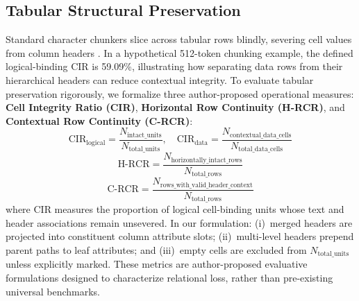 \documentclass[conference,a4paper]{IEEEtran}
\begin{document}
\subsection{Tabular Structural Preservation}
Standard character chunkers slice across tabular rows blindly, severing cell values from column headers \cite{chen2024tablerag}. In a hypothetical 512-token chunking example, the defined logical-binding CIR is 59.09\%, illustrating how separating data rows from their hierarchical headers can reduce contextual integrity. To evaluate tabular preservation rigorously, we formalize three author-proposed operational measures: \textbf{Cell Integrity Ratio (CIR)}, \textbf{Horizontal Row Continuity (H-RCR)}, and \textbf{Contextual Row Continuity (C-RCR)}:
\begin{equation}
\text{CIR}_{\text{logical}} = \frac{N_{\text{intact\_units}}}{N_{\text{total\_units}}}, \quad \text{CIR}_{\text{data}} = \frac{N_{\text{contextual\_data\_cells}}}{N_{\text{total\_data\_cells}}}
\label{eq:cir}
\end{equation}
\begin{equation}
\text{H-RCR} = \frac{N_{\text{horizontally\_intact\_rows}}}{N_{\text{total\_rows}}}
\label{eq:hrcr}
\end{equation}
\begin{equation}
\text{C-RCR} = \frac{N_{\text{rows\_with\_valid\_header\_context}}}{N_{\text{total\_rows}}}
\label{eq:crcr}
\end{equation}
where CIR measures the proportion of logical cell-binding units whose text and header associations remain unsevered. In our formulation: (i)~merged headers are projected into constituent column attribute slots; (ii)~multi-level headers prepend parent paths to leaf attributes; and (iii)~empty cells are excluded from $N_{\text{total\_units}}$ unless explicitly marked. These metrics are author-proposed evaluative formulations designed to characterize relational loss, rather than pre-existing universal benchmarks.
\end{document}
